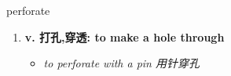 
\begin{frame}
{\huge perforate}
\begin{center}
\begin{enumerate}\Large
  \item \textbf{v. 打孔,穿透: to make a hole through}
  \begin{itemize}
    \item \em{\Large{to perforate with a pin 用针穿孔}}
  \end{itemize}
\end{enumerate}
\end{center}
\end{frame}
